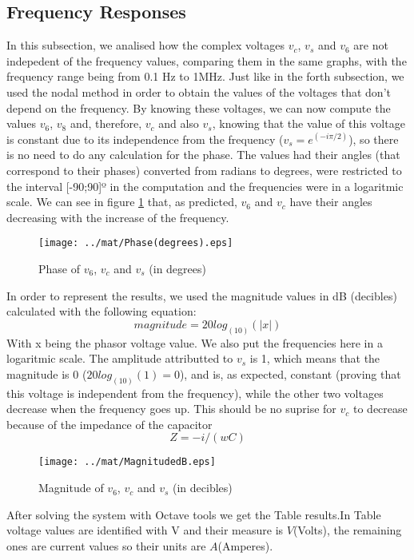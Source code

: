 \subsection{Frequency Responses}
In this subsection, we analised how the complex voltages $v_c$, $v_s$ and $v_6$ are not indepedent of the frequency values, comparing them in the same graphs, with the frequency range being from 0.1 Hz to 1MHz. Just like in the forth subsection, we used the nodal method in order to obtain the values of the voltages that don't depend on the frequency. By knowing these voltages, we can now compute the values $v_6$, $v_8$ and, therefore, $v_c$ and also $v_s$, knowing that the value of this voltage is constant due to its independence from the frequency ($v_s = e^(-i\pi/2)$), so there is no need to do any calculation for the phase.
The values had their angles (that correspond to their phases) converted from radians to degrees, were restricted to the interval [-90;90]º in the computation and the frequencies were in a logaritmic scale. We can see in figure \ref{fig:mat5db} that, as predicted, $v_6$ and $v_c$ have their angles decreasing with the increase of the frequency.

\begin{figure}[H] \centering
\texttt{[image: ../mat/Phase(degrees).eps]}
\caption{Phase of $v_6$, $v_c$ and $v_s$ (in degrees)}
\label{fig:mat5db}
\end{figure}

In order to represent the results, we used the magnitude values in dB (decibles) calculated with the following equation:
\begin{equation}
magnitude = 20log_(10)(|x|)
\label{eq:1.21}
\end{equation}
With x being the phasor voltage value. 
We also put the frequencies here in a logaritmic scale. The amplitude attributted to $v_s$ is 1, which means that the magnitude is 0 ($20log_(10)(1)=0$), and is, as expected, constant (proving that this voltage is independent from the frequency), while the other two voltages decrease when the frequency goes up. This should be no suprise for $v_c$ to decrease because of the impedance of the capacitor
\begin{equation}
Z = -i/(wC)
\label{eq:1.22}
\end{equation}

\begin{figure}[H] \centering
\texttt{[image: ../mat/MagnitudedB.eps]}
\caption{Magnitude of $v_6$, $v_c$ and $v_s$ (in decibles)}
\label{fig:mat5ps}
\end{figure}



After solving the system with Octave tools we get the Table results.In Table voltage values are identified with V and their measure is $V$(Volts), the remaining ones are current values so their units are $A$(Amperes).





